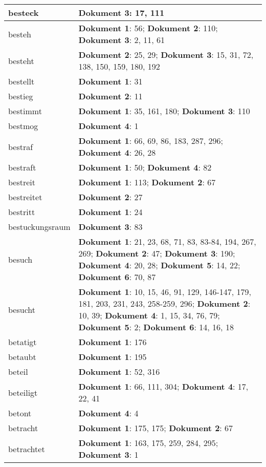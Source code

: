 \documentclass[a5paper]{article}
\begin{document}
\begin{longtable}[l]{|l|p{3in}|}
\hline
besteck & \textbf{Dokument 3}: 17, 111 \\
\hline
besteh & \textbf{Dokument 1}: 56; \textbf{Dokument 2}: 110; \textbf{Dokument 3}: 2, 11, 61 \\
\hline
besteht & \textbf{Dokument 2}: 25, 29; \textbf{Dokument 3}: 15, 31, 72, 138, 150, 159, 180, 192 \\
\hline
bestellt & \textbf{Dokument 1}: 31 \\
\hline
bestieg & \textbf{Dokument 2}: 11 \\
\hline
bestimmt & \textbf{Dokument 1}: 35, 161, 180; \textbf{Dokument 3}: 110 \\
\hline
bestmog & \textbf{Dokument 4}: 1 \\
\hline
bestraf & \textbf{Dokument 1}: 66, 69, 86, 183, 287, 296; \textbf{Dokument 4}: 26, 28 \\
\hline
bestraft & \textbf{Dokument 1}: 50; \textbf{Dokument 4}: 82 \\
\hline
bestreit & \textbf{Dokument 1}: 113; \textbf{Dokument 2}: 67 \\
\hline
bestreitet & \textbf{Dokument 2}: 27 \\
\hline
bestritt & \textbf{Dokument 1}: 24 \\
\hline
bestuckungsraum & \textbf{Dokument 3}: 83 \\
\hline
besuch & \textbf{Dokument 1}: 21, 23, 68, 71, 83, 83-84, 194, 267, 269; \textbf{Dokument 2}: 47; \textbf{Dokument 3}: 190; \textbf{Dokument 4}: 20, 28; \textbf{Dokument 5}: 14, 22; \textbf{Dokument 6}: 70, 87 \\
\hline
besucht & \textbf{Dokument 1}: 10, 15, 46, 91, 129, 146-147, 179, 181, 203, 231, 243, 258-259, 296; \textbf{Dokument 2}: 10, 39; \textbf{Dokument 4}: 1, 15, 34, 76, 79; \textbf{Dokument 5}: 2; \textbf{Dokument 6}: 14, 16, 18 \\
\hline
betatigt & \textbf{Dokument 1}: 176 \\
\hline
betaubt & \textbf{Dokument 1}: 195 \\
\hline
beteil & \textbf{Dokument 1}: 52, 316 \\
\hline
beteiligt & \textbf{Dokument 1}: 66, 111, 304; \textbf{Dokument 4}: 17, 22, 41 \\
\hline
betont & \textbf{Dokument 4}: 4 \\
\hline
betracht & \textbf{Dokument 1}: 175, 175; \textbf{Dokument 2}: 67 \\
\hline
betrachtet & \textbf{Dokument 1}: 163, 175, 259, 284, 295; \textbf{Dokument 3}: 1 \\

\end{longtable}
\end{document}
